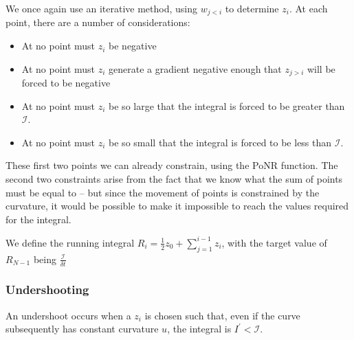 \documentclass[]{article}
\begin{document}
				We once again use an iterative method, using $w_{j < i}$ to determine $z_i$. At each point, there are a number of considerations:
				\begin{itemize}
					\item At no point must $z_i$ be negative
					\item At no point must $z_i$ generate a gradient negative enough that $z_{j > i}$ will be forced to be negative
					\item At no point must $z_i$ be so large that the integral is forced to be greater than $\mathcal{I}$.
					\item At no point must $z_i$ be so small that the integral is forced to be less than $\mathcal{I}$.
				\end{itemize}
				These first two points we can already constrain, using the PoNR function. The second two constraints arise from the fact that we know what the sum of points must be equal to -- but since the movement of points is constrained by the curvature, it would be possible to make it impossible to reach the values required for the integral. 

				We define the running integral $R_i = \frac{1}{2} z_0 + \sum_{j = 1}^{i-1} z_i$, with the target value of $R_{N-1}$ being $\frac{\mathcal{I}}{\delta t}$

				\subsubsection{Undershooting}


					An undershoot occurs when a $z_i$ is chosen such that, even if the curve subsequently has constant curvature $u$, the integral is $I^\prime < \mathcal{I}$.	
\end{document}
